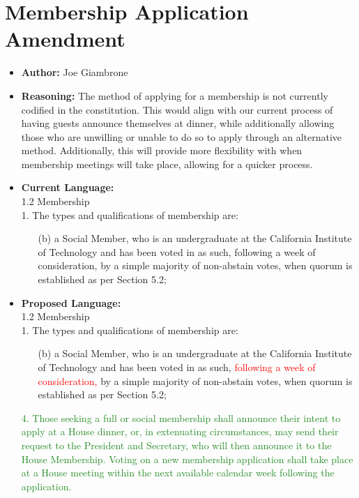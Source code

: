 \documentclass[10pt]{article} %
\newcommand{\del}[1]{\textcolor{red}{#1}} %
\begin{document}
\section{Membership Application Amendment}
\begin{itemize}
    \item \textbf{Author:} Joe Giambrone
    \item \textbf{Reasoning:} The method of applying for a membership is not currently codified in the constitution. This would align with our current process of having guests announce themselves at dinner, while additionally allowing those who are unwilling or unable to do so to apply through an alternative method. Additionally, this will provide more flexibility with when membership meetings will take place, allowing for a quicker process.
    
    \item \textbf{Current Language:} \\
        1.2 Membership \\
        1. The types and qualifications of membership are:
        \begin{enumerate}[label=(\alph*)]
            \item[(b)] a Social Member, who is an undergraduate at the California Institute of Technology and has been voted in as such, following a week of consideration, by a simple majority of non-abstain votes, when quorum is established as per Section 5.2;
        \end{enumerate}

    \item \textbf{Proposed Language:} \\
        1.2 Membership \\
        1. The types and qualifications of membership are:
        \begin{enumerate}[label=(\alph*)]
            \item[(b)] a Social Member, who is an undergraduate at the California Institute of Technology and has been voted in as such, \del{following a week of consideration,} by a simple majority of non-abstain votes, when quorum is established as per Section 5.2;
        \end{enumerate}
        \textcolor{ForestGreen}{4. Those seeking a full or social membership shall announce their intent to apply at a House dinner, or, in extenuating circumstances, may send their request to the President and Secretary, who will then announce it to the House Membership. Voting on a new membership application shall take place at a House meeting within the next available calendar week following the application.}
\end{itemize}
\end{document}

